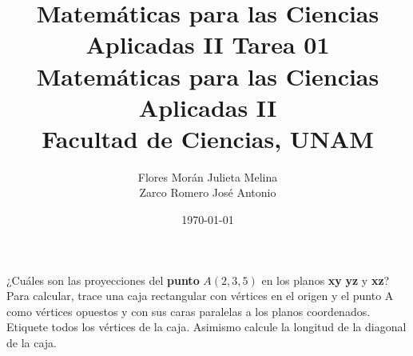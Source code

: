 \documentclass[12pt]{article}
\title{Matemáticas para las Ciencias Aplicadas II}
\title{
	\textbf{Tarea 01} \\
	\vspace{1ex}
	\large Matemáticas para las Ciencias Aplicadas II \\
	Facultad de Ciencias, UNAM}
\date{\today}
\author{Flores Morán Julieta Melina \\ Zarco Romero José Antonio}
\begin{document}
\maketitle

\section{}

¿Cuáles son las proyecciones del \textbf{punto} $A(2,3,5)$ en los planos \textbf{xy} \textbf{yz} y \textbf{xz}? Para calcular, trace una caja rectangular con vértices en el origen y el punto A como vértices opuestos y con sus caras paralelas a los planos coordenados. Etiquete todos los vértices de la caja. Asimismo calcule la longitud de la diagonal de la caja.
\end{document}
